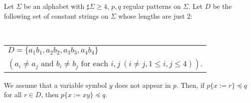 \begin{lem}\label{lem:4pairsofSymbols}\label{補題14}
Let $\Sigma$ be an alphabet with $\sharp\Sigma \ge 4$, $p,q$ regular patterns on $\Sigma$.
Let $D$ be the following set of constant strings on $\Sigma$ whose lengths are just 2:

\medskip
\noindent
~~\begin{tabular}{l}
  $D = \{ a_{1}b_{1}, a_{2}b_{2}, a_{3}b_{3}, a_{4}b_{4} \}$\\
  $(a_{i} \ne a_{j} \mbox{ and } b_{i} \ne b_{j} \mbox{ for each } i,j~(i\ne j, 1\le i,j\le 4))$.
\end{tabular}
\medskip

\noindent
We assume that a variable symbol $y$ does not appear in $p$.
Then, if $p \{ x := r \} \preceq q$ for all $r \in D$, then $p \{ x := xy \} \preceq q$.  
\end{lem}
